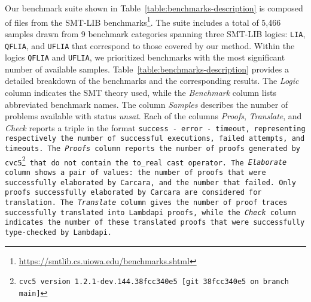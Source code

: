 Our benchmark suite shown in Table~\ref{table:benchmarks-description} is composed of files from the SMT-LIB benchmarks\footnote{\url{https://smtlib.cs.uiowa.edu/benchmarks.shtml}}.
The suite includes a total of 5,466 samples drawn from 9 benchmark categories spanning three SMT-LIB logics: \texttt{LIA}, \texttt{QFLIA}, and \texttt{UFLIA} that correspond to those covered by our method.
Within the logics \texttt{QFLIA} and \texttt{UFLIA}, we prioritized benchmarks with the most significant number of available samples.
Table~\ref{table:benchmarks-description} provides a detailed breakdown of the benchmarks and the corresponding results.
The \emph{Logic} column indicates the SMT theory used, while the \emph{Benchmark} column lists abbreviated benchmark names.
The column \emph{Samples} describes the number of problems available with status \emph{unsat}. 
Each of the columns \emph{Proofs}, \emph{Translate}, and \emph{Check} reports a triple in the format \tt{success - error - timeout}, representing respectively the number of successful executions, failed attempts, and timeouts. 
The \emph{Proofs} column reports the number of proofs generated by cvc5\footnote{cvc5 version 1.2.1-dev.144.38fcc340e5 [git 38fcc340e5 on branch main]} that do not contain the \lstinline[language=SMT,basicstyle=\ttfamily\footnotesize]|to_real| cast operator.
The \emph{Elaborate} column shows a pair of values: the number of proofs that were successfully elaborated by Carcara, and the number that failed. Only proofs successfully elaborated by Carcara are considered for translation.
The \emph{Translate} column gives the number of proof traces successfully translated into Lambdapi proofs, while the \emph{Check} column indicates the number of these translated proofs that were successfully type-checked by Lambdapi. 


